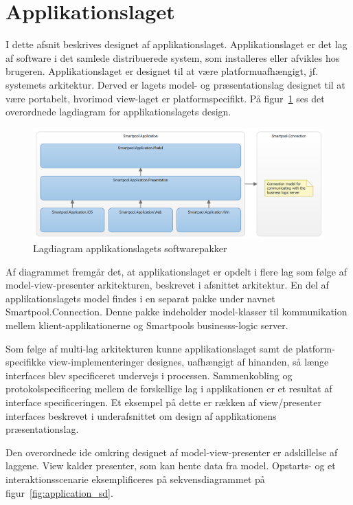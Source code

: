 \section{Applikationslaget}
I dette afsnit beskrives designet af applikationslaget. Applikationslaget er det lag af software i det samlede distribuerede system, som installeres eller afvikles hos brugeren. Applikationslaget er designet til at være platformuafhængigt, jf. systemets arkitektur. Derved er lagets model- og præsentationslag designet til at være portabelt, hvorimod view-laget er platformspecifikt. På figur~\ref{fig:application_layer} ses det overordnede lagdiagram for applikationslagets design.

\begin{figure}
	\centering
	\includegraphics[width=1.0\linewidth]{figs/design/application_layer}
	\caption{Lagdiagram applikationslagets softwarepakker}
	\label{fig:application_layer}
\end{figure}

Af diagrammet fremgår det, at applikationslaget er opdelt i flere lag som følge af model-view-presenter arkitekturen, beskrevet i afsnittet arkitektur. En del af applikationslagets model findes i en separat pakke under navnet Smartpool.Connection. Denne pakke indeholder model-klasser til kommunikation mellem klient-applikationerne og Smartpools businesss-logic server.

Som følge af multi-lag arkitekturen kunne applikationslaget samt de platform-specifikke view-implementeringer designes, uafhængigt af hinanden, så længe interfaces blev specificeret undervejs i processen. Sammenkobling og protokolspecificering mellem de forskellige lag i applikationen er et resultat af interface specificeringen. Et eksempel på dette er rækken af view/presenter interfaces beskrevet i underafsnittet om design af applikationens præsentationslag.

Den overordnede ide omkring designet af model-view-presenter er adskillelse af laggene. View kalder presenter, som kan hente data fra model. Opstarts- og et interaktionsscenarie eksemplificeres på sekvensdiagrammet på figur~\ref{fig:application_sd}.

